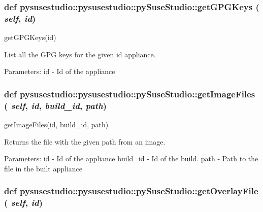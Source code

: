  \hypertarget{classpysusestudio_1_1pysusestudio_1_1py_suse_studio_aed45dc8653946bdc1082a5cab5fc63a0}{
\subsubsection[{getGPGKeys}]{\setlength{\rightskip}{0pt plus 5cm}def pysusestudio::pysusestudio::pySuseStudio::getGPGKeys ( {\em self}, \/   {\em id})}}
\label{classpysusestudio_1_1pysusestudio_1_1py_suse_studio_aed45dc8653946bdc1082a5cab5fc63a0}
\begin{DoxyVerb}getGPGKeys(id)

        List all the GPG keys for the given id appliance.  
            
            Parameters:
id - Id of the appliance

\end{DoxyVerb}
 \hypertarget{classpysusestudio_1_1pysusestudio_1_1py_suse_studio_a9dd3cc298c74a2896060def6d66c8415}{
\subsubsection[{getImageFiles}]{\setlength{\rightskip}{0pt plus 5cm}def pysusestudio::pysusestudio::pySuseStudio::getImageFiles ( {\em self}, \/   {\em id}, \/   {\em build\_\-id}, \/   {\em path})}}
\label{classpysusestudio_1_1pysusestudio_1_1py_suse_studio_a9dd3cc298c74a2896060def6d66c8415}
\begin{DoxyVerb}getImageFiles(id, build_id, path)

        Returns the file with the given path from an image.   
            
            Parameters:
id - Id of the appliance
build_id - Id of the build.
path - Path to the file in the built appliance
\end{DoxyVerb}
 \hypertarget{classpysusestudio_1_1pysusestudio_1_1py_suse_studio_a9deb82a64dfb19c8c8733ae530a9b053}{
\subsubsection[{getOverlayFile}]{\setlength{\rightskip}{0pt plus 5cm}def pysusestudio::pysusestudio::pySuseStudio::getOverlayFile ( {\em self}, \/   {\em id})}}
